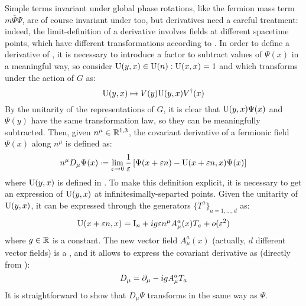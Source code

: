 Simple terms invariant under global phase rotations, like the fermion mass term $ m \bar{\Psi} \Psi $, are of course invariant under  too, but derivatives need a careful treatment: indeed, the limit-definition of a derivative involves fields at different spacetime points, which have different transformations according to . In order to define a derivative of \Psi, it is necessary to introduce a factor to subtract values of $ \Psi(x) $ in a meaningful way, so consider $ \mathrm{U}(y,x) \in \mathrm{U}(n) : \mathrm{U}(x,x) = 1 $ and which transforms under the action of $ G $ as:
\begin{equation}
  \mathrm{U}(y,x) \mapsto V(y) \mathrm{U}(y,x) V^\dagger(x)
  \label{eq:fac-cov-der}
\end{equation}
By the unitarity of the representations of $ G $, it is clear that $ \mathrm{U}(y,x) \Psi(x) $ and $ \Psi(y) $ have the same transformation law, so they can be meaningfully subtracted. Then, given $ n^\mu \in \mathbb{R}^{1,3} $, the covariant derivative of a fermionic field $ \Psi(x) $ along $ n^\mu $ is defined as:
\begin{equation}
  n^\mu D_\mu \Psi(x) \defeq \lim_{\varepsilon \rightarrow 0} \frac{1}{\varepsilon} \left[ \Psi(x + \varepsilon n) - \tens{U}(x + \varepsilon n, x) \Psi(x) \right]
  \label{eq:cov-der-def}
\end{equation}
where $ \mathrm{U}(y,x) $ is defined in . To make this definition explicit, it is necessary to get an expression of $ \mathrm{U}(y,x) $ at infinitesimally-separted points. Given the unitarity of $ \mathrm{U}(y,x) $, it can be expressed through the generators $ \{T^a\}_{a = 1, \dots, d} $ as:
\begin{equation}
  \mathrm{U}(x + \varepsilon n, x) = \mathrm{I}_n + i g \varepsilon n^\mu A_\mu^a(x) T_a + o(\varepsilon^2)
  \label{eq:fac-cov-der-exp}
\end{equation}
where $ g \in \mathbb{R} $ is a constant. The new vector field $ A_\mu^a(x) $ (actually, $ d $ different vector fields) is a , and it allows to express the covariant derivative as (directly from ):
\begin{equation}
  D_\mu = \partial_\mu - i g A_\mu^a T_a
\end{equation}
It is straightforward to show that $ D_\mu \Psi $ transforms in the same way as $ \Psi $.

